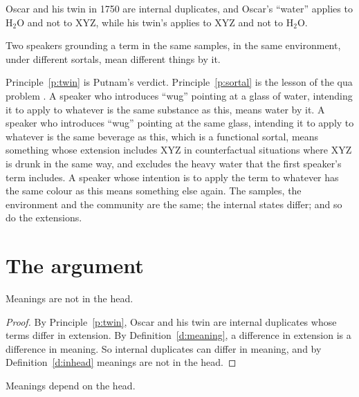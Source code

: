 \documentclass{situationist-preprint}
\begin{document}
\begin{principle}\label{p:twin}
Oscar and his twin in 1750 are internal duplicates, and Oscar's \enquote{water} applies to H$_2$O and not to XYZ, while his twin's applies to XYZ and not to H$_2$O.
\end{principle}

\begin{principle}\label{p:sortal}
Two speakers grounding a term in the same samples, in the same environment, under different sortals, mean different things by it.
\end{principle}

Principle~\ref{p:twin} is Putnam's verdict. Principle~\ref{p:sortal} is the lesson of the qua problem \citep{DevittSterelny1987}. A speaker who introduces \enquote{wug} pointing at a glass of water, intending it to apply to whatever is the same substance as this, means water by it. A speaker who introduces \enquote{wug} pointing at the same glass, intending it to apply to whatever is the same beverage as this, which is a functional sortal, means something whose extension includes XYZ in counterfactual situations where XYZ is drunk in the same way, and excludes the heavy water that the first speaker's term includes. A speaker whose intention is to apply the term to whatever has the same colour as this means something else again. The samples, the environment and the community are the same; the internal states differ; and so do the extensions.

\section{The argument}

\begin{theorem}\label{t:nothead}
Meanings are not in the head.
\end{theorem}

\begin{proof}
By Principle~\ref{p:twin}, Oscar and his twin are internal duplicates whose terms differ in extension. By Definition~\ref{d:meaning}, a difference in extension is a difference in meaning. So internal duplicates can differ in meaning, and by Definition~\ref{d:inhead} meanings are not in the head.
\end{proof}

\begin{theorem}\label{t:depend}
Meanings depend on the head.
\end{theorem}
\end{document}
